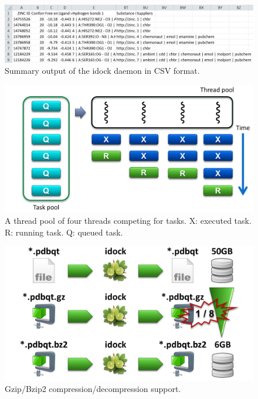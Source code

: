 \documentclass[12pt]{article}
\begin{document}
\clearpage

\begin{figure}
\begin{center}
\includegraphics[width=\linewidth,keepaspectratio=true]{OutputCSV.png}
\caption{\label{OutputCSV} Summary output of the idock daemon in CSV format.}
\end{center}
\end{figure}

\clearpage

\begin{figure}
\begin{center}
\includegraphics[width=\linewidth]{ThreadPool.png}
\caption{A thread pool of four threads competing for tasks. X: executed task. R: running task. Q: queued task.}
\label{ThreadPool}
\end{center}
\end{figure}

\clearpage

\begin{figure}
\begin{center}
\includegraphics[width=\linewidth]{Compression.png}
\caption{Gzip/Bzip2 compression/decompression support.}
\label{Compression}
\end{center}
\end{figure}
\end{document}
